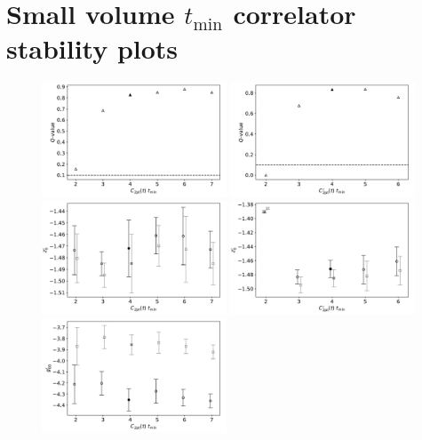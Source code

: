 \documentclass[prd,aps,twocolumn,superscriptaddress,tightenlines,nofootinbib,floatfix,preprintnumbers,10pt]{revtex4-1}
\begin{document}
\section{Small volume $t_{\mathrm{min}}$ correlator stability plots}
\begin{figure}[h]{
		\includegraphics[width=0.49\textwidth]{plots/figures/3296_2pt_Q.pdf}
		\includegraphics[width=0.49\textwidth]{plots/figures/3296_d2pt_Q.pdf}
		\includegraphics[width=0.49\textwidth]{plots/figures/3296_2pt_dZ0.pdf}
		\includegraphics[width=0.49\textwidth]{plots/figures/3296_d2pt_dZ0.pdf}
		\includegraphics[width=0.49\textwidth]{plots/figures/3296_2pt_dgV.pdf}
}
\end{figure}
\end{document}
